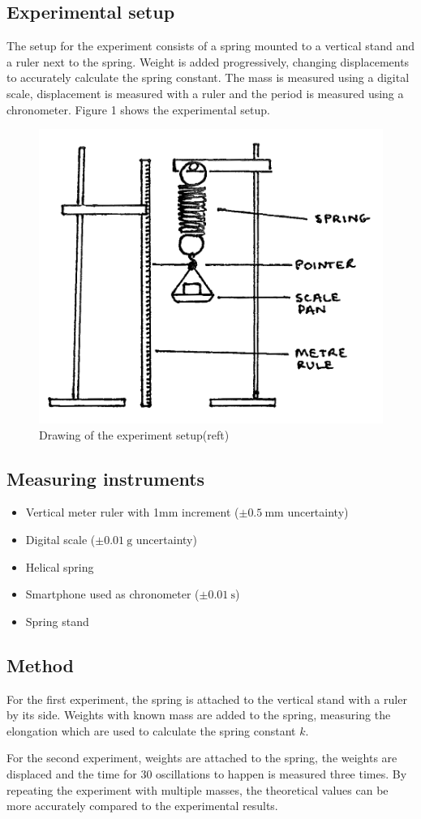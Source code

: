 \documentclass[a4paper, 10pt]{article}
\newcommand{\unit}[1]{~\mathrm{#1}}
\begin{document}
\begin{justify}
\subsection{Experimental setup}
The setup for the experiment consists of a spring mounted to a vertical stand
and a ruler next to the spring. Weight is added progressively, changing
displacements to accurately calculate the spring constant. The mass is measured
using a digital scale, displacement is measured with a ruler and the period is
measured using a chronometer. Figure 1 shows the experimental setup.
\begin{figure}[!h]
    \centering
    \includegraphics[width = 0.5\linewidth]{13.png}
    \caption{Drawing of the experiment setup(reft)}
\end{figure}
\newpage
\subsection{Measuring instruments}
\begin{itemize}
    \item Vertical meter ruler with 1mm increment ($\pm 0.5\unit{mm}$ uncertainty)
    \item Digital scale ($\pm 0.01\unit{g}$ uncertainty)
    \item Helical spring
    \item Smartphone used as chronometer ($\pm  0.01\unit{s} $)
    \item Spring stand
\end{itemize}
\subsection{Method}
\justifying
For the first experiment, the spring is attached to the vertical stand with a ruler by its side. Weights
with known mass are added to the spring, measuring the elongation which are used
to calculate the spring constant $k$.
\par
For the second experiment, weights are attached to the spring, the weights
are displaced and the time for 30 oscillations to happen is measured three
times. By repeating the experiment with multiple masses, the theoretical values
can be more accurately compared to the experimental results.

\end{justify}
\end{document}
